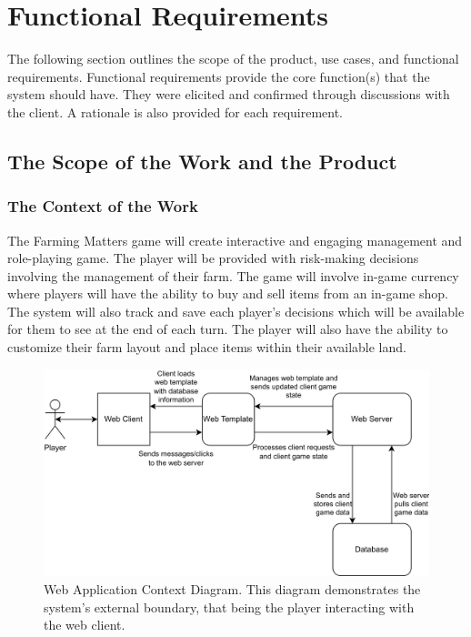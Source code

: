 \documentclass{article}
\begin{document}
\section{Functional Requirements}
The following section outlines the scope of the product, use cases, and functional requirements. Functional requirements provide the core function(s) that the system should have. They were elicited and confirmed through discussions with the client. A rationale is also provided for each requirement.

\subsection{The Scope of the Work and the Product}

\subsubsection{The Context of the Work}
The Farming Matters game will create interactive and engaging management and role-playing game. The player will be provided with risk-making decisions involving the management of their farm. The game will involve in-game currency where players will have the ability to buy and sell items from an in-game shop. The system will also track and save each player's decisions which will be available for them to see at the end of each turn. The player will also have the ability to customize their farm layout and place items within their available land. 

\begin{figure}[!htb]
    \centering
    \includegraphics[width=14cm]{srs.drawio.png}
    \caption{Web Application Context Diagram. This diagram demonstrates the system's external boundary, that being the player interacting with the web client.}
    \label{fig:context_diagram}
\end{figure}
\newpage
\end{document}
